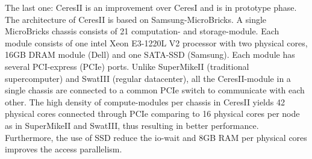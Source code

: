 \documentclass[conference]{IEEEtran}
\begin{document}
The last one: CeresII is an improvement over CeresI \cite{Cluster:ceres1} and is in prototype phase. 
The architecture of CeresII is based on Samsung-MicroBricks.
A single MicroBricks chassis consists of 21 computation- and storage-module.
Each module consists of one intel Xeon E3-1220L V2 processor with two physical cores, 16GB DRAM module (Dell) and  one SATA-SSD (Samsung).
Each module has several PCI-express (PCIe) ports.
Unlike SuperMikeII (traditional supercomputer) and SwatIII (regular datacenter), all the CeresII-module in a single chassis are connected to a common PCIe switch to communicate with each other.
The high density of compute-modules per chassis in CeresII yields 42 physical cores connected through PCIe comparing to 16 physical cores per node as in SuperMikeII and SwatIII, thus resulting in better performance.
Furthermore, the use of SSD reduce the io-wait and 8GB RAM per physical cores improves the access parallelism.

\end{document}

